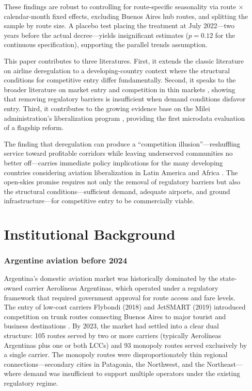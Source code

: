 \documentclass[12pt]{article}
\begin{document}
These findings are robust to controlling for route-specific seasonality via route $\times$ calendar-month fixed effects, excluding Buenos Aires hub routes, and splitting the sample by route size. A placebo test placing the treatment at July 2022---two years before the actual decree---yields insignificant estimates ($p = 0.12$ for the continuous specification), supporting the parallel trends assumption.

This paper contributes to three literatures. First, it extends the classic literature on airline deregulation \citep{borenstein1992, morrison1995, brueckner2013, berry1992} to a developing-country context where the structural conditions for competitive entry differ fundamentally. Second, it speaks to the broader literature on market entry and competition in thin markets \citep{bresnahan1991, berry1999, ciliberto2010, aguirregabiria2012}, showing that removing regulatory barriers is insufficient when demand conditions disfavor entry. Third, it contributes to the growing evidence base on the Milei administration's liberalization program \citep{cavallo2024}, providing the first microdata evaluation of a flagship reform.

The finding that deregulation can produce a ``competition illusion''---reshuffling service toward profitable corridors while leaving underserved communities no better off---carries immediate policy implications for the many developing countries considering aviation liberalization in Latin America and Africa \citep{button2010, schlumberger2010, cristea2012}. The open-skies promise requires not only the removal of regulatory barriers but also the structural conditions---sufficient demand, adequate airports, and ground infrastructure---for competitive entry to be commercially viable.


\section{Institutional Background}

\subsubsection*{Argentine aviation before 2024} Argentina's domestic aviation market was historically dominated by the state-owned carrier Aerol\'{i}neas Argentinas, which operated under a regulatory framework that required government approval for route access and fare levels. The entry of low-cost carriers Flybondi (2018) and JetSMART (2019) introduced competition on trunk routes connecting Buenos Aires to major tourist and business destinations \citep{doganis2019}. By 2023, the market had settled into a clear dual structure: 105 routes served by two or more carriers (typically Aerol\'{i}neas Argentinas plus one or both LCCs) and 93 monopoly routes served exclusively by a single carrier. The monopoly routes were disproportionately thin regional connections---secondary cities in Patagonia, the Northwest, and the Northeast---where demand was insufficient to support multiple operators under the existing regulatory regime.
\end{document}
